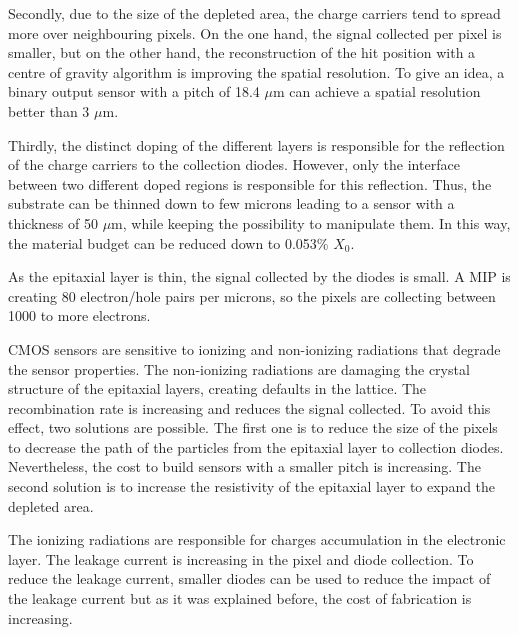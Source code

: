     Secondly, due to the size of the depleted area, the charge carriers tend to spread more over neighbouring pixels.
    On the one hand, the signal collected per pixel is smaller, but on the other hand, the reconstruction of the hit position with a centre of gravity algorithm is improving the spatial resolution.
    To give an idea, a binary output sensor with a pitch of 18.4 $\mu\text{m}$ can achieve a spatial resolution better than 3 $\mu\text{m}$.

    Thirdly, the distinct doping of the different layers is responsible for the reflection of the charge carriers to the collection diodes.
    However, only the interface between two different doped regions is responsible for this reflection.
    Thus, the substrate can be thinned down to few microns leading to a sensor with a thickness of 50 $\mu\text{m}$, while keeping the possibility to manipulate them.
    In this way, the material budget can be reduced down to 0.053\% $X_0$.

    As the epitaxial layer is thin, the signal collected by the diodes is small.
    A \gls{MIP} is creating 80 electron/hole pairs per microns, so the pixels are collecting between 1000 to more electrons.

    CMOS sensors are sensitive to ionizing and non-ionizing radiations that degrade the sensor properties.
    The non-ionizing radiations are damaging the crystal structure of the epitaxial layers, creating defaults in the lattice.
    The recombination rate is increasing and reduces the signal collected.
    To avoid this effect, two solutions are possible.
    The first one is to reduce the size of the pixels to decrease the path of the particles from the epitaxial layer to collection diodes.
    Nevertheless, the cost to build sensors with a smaller pitch is increasing.
    The second solution is to increase the resistivity of the epitaxial layer to expand the depleted area.
    
    The ionizing radiations are responsible for charges accumulation in the electronic layer.
    The leakage current is increasing in the pixel and diode collection.
    To reduce the leakage current, smaller diodes can be used to reduce the impact of the leakage current but as it was explained before, the cost of fabrication is increasing.
    
